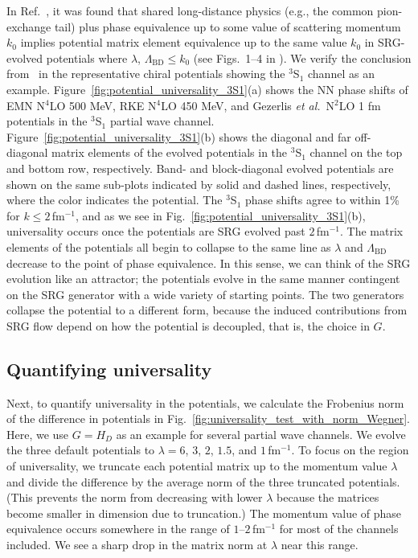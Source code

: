 \documentclass[10pt,aps,prc,floatfix,twocolumn,nofootinbib]{revtex4-1}
\newcommand{\LambdaBD}{{\Lambda_{\text{BD}}}}
\begin{document}
In Ref.~\cite{Dainton:2013axa}, it was found that shared long-distance physics (e.g., the common pion-exchange tail) plus phase equivalence up to some value of scattering momentum $k_0$ implies potential matrix element equivalence up to the same value $k_0$ in SRG-evolved potentials where $\lambda$, $\LambdaBD \leq k_0$ (see Figs.\ 1--4 in \cite{Dainton:2013axa}).
We verify the conclusion from~\cite{Dainton:2013axa} in the representative chiral potentials showing the $^3$S$_1$ channel as an example.
Figure~\ref{fig:potential_universality_3S1}(a) shows the NN phase shifts of EMN N$^4$LO 500 MeV, RKE N$^4$LO 450 MeV, and Gezerlis \textit{et al.}~N$^2$LO 1 fm potentials in the $^3$S$_1$ partial wave channel.
Figure~\ref{fig:potential_universality_3S1}(b) shows the diagonal and far off-diagonal matrix elements of the evolved potentials in the $^3$S$_1$ channel on the top and bottom row, respectively.
Band- and block-diagonal evolved potentials are shown on the same sub-plots indicated by solid and dashed lines, respectively, where the color indicates the potential.
The $^3$S$_1$ phase shifts agree to within 1\% for $k \leq 2$\,fm$^{-1}$, and as we see in Fig.~\ref{fig:potential_universality_3S1}(b), universality occurs once the potentials are SRG evolved past $2$\,fm$^{-1}$.
The matrix elements of the potentials all begin to collapse to the same line as $\lambda$ and $\LambdaBD$ decrease to the point of phase equivalence.
In this sense, we can think of the SRG evolution like an attractor; the potentials evolve in the same manner contingent on the SRG generator with a wide variety of starting points.
The two generators collapse the potential to a different form, because the induced contributions from SRG flow depend on how the potential is decoupled, that is, the choice in $G$.


\subsection{Quantifying universality}
\label{subsec:quantifying_universality}


Next, to quantify universality in the potentials, we calculate the Frobenius norm of the difference in potentials in Fig.~\ref{fig:universality_test_with_norm_Wegner}.
Here, we use $G=H_D$ as an example for several partial wave channels.
We evolve the three default potentials to $\lambda=6$, $3$, $2$, $1.5$, and $1$\,fm$^{-1}$.
To focus on the region of universality, we truncate each potential matrix up to the momentum value $\lambda$ and divide the difference by the average norm of the three truncated potentials.
(This prevents the norm from decreasing with lower $\lambda$ because the matrices become smaller in dimension due to truncation.)
The momentum value of phase equivalence occurs somewhere in the range of $1$--$2$\,fm$^{-1}$ for most of the channels included.
We see a sharp drop in the matrix norm at $\lambda$ near this range.
\end{document}
